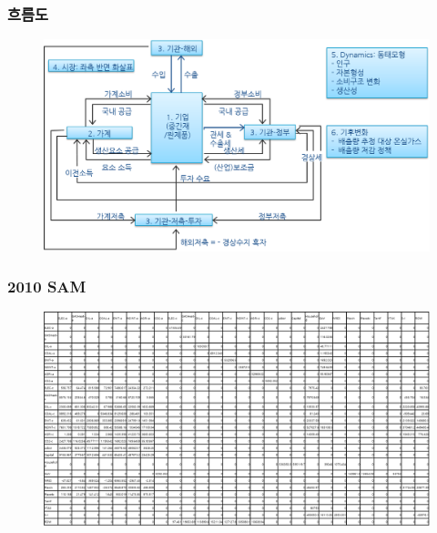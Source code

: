 \documentclass[10pt,compress,slidetop,%
			   hyperref={unicode},xcolor={svgnames},%
			   t]{beamer}
\begin{document}
\begin{frame}
	\frametitle{흐름도} 
		  	\begin{figure}
	\centering
	 \includegraphics[width=1.00\textwidth]{CGEflow.png}
	\end{figure}
\end{frame}


\begin{frame}
	\frametitle{2010 SAM}
		  	\begin{figure}
	\centering
	 \includegraphics[width=1.00\textwidth]{SAMex.png}
	\end{figure}
\end{frame}
\end{document}
